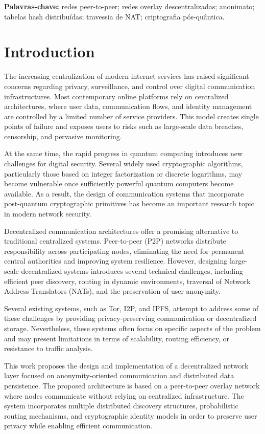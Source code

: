 \documentclass[12pt,a4paper]{article}
\begin{document}
\noindent\textbf{Palavras-chave:} redes peer-to-peer; redes overlay descentralizadas; anonimato; tabelas hash distribuídas; travessia de NAT; criptografia pós-quântica.

\newpage
\listoffigures     
\listoftables  
\tableofcontents
\newpage

\section{Introduction}
The increasing centralization of modern internet services has raised significant concerns regarding privacy, surveillance, and control over digital communication infrastructures. Most contemporary online platforms rely on centralized architectures, where user data, communication flows, and identity management are controlled by a limited number of service providers. This model creates single points of failure and exposes users to risks such as large-scale data breaches, censorship, and pervasive monitoring.

At the same time, the rapid progress in quantum computing introduces new challenges for digital security. Several widely used cryptographic algorithms, particularly those based on integer factorization or discrete logarithms, may become vulnerable once sufficiently powerful quantum computers become available. As a result, the design of communication systems that incorporate post-quantum cryptographic primitives has become an important research topic in modern network security.

Decentralized communication architectures offer a promising alternative to traditional centralized systems. Peer-to-peer (P2P) networks distribute responsibility across participating nodes, eliminating the need for permanent central authorities and improving system resilience. However, designing large-scale decentralized systems introduces several technical challenges, including efficient peer discovery, routing in dynamic environments, traversal of Network Address Translators (NATs), and the preservation of user anonymity.

Several existing systems, such as Tor, I2P, and IPFS, attempt to address some of these challenges by providing privacy-preserving communication or decentralized storage. Nevertheless, these systems often focus on specific aspects of the problem and may present limitations in terms of scalability, routing efficiency, or resistance to traffic analysis.

This work proposes the design and implementation of a decentralized network layer focused on anonymity-oriented communication and distributed data persistence. The proposed architecture is based on a peer-to-peer overlay network where nodes communicate without relying on centralized infrastructure. The system incorporates multiple distributed discovery structures, probabilistic routing mechanisms, and cryptographic identity models in order to preserve user privacy while enabling efficient communication.
\end{document}
